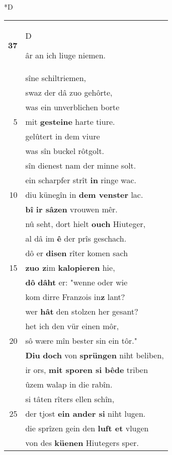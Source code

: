 \documentclass[8pt,a4paper,notitlepage]{article}
\begin{document}
\begin{table}[ht]
\begin{minipage}[t]{0.5\linewidth}
\small
\begin{center}*D
\end{center}
\begin{tabular}{rl}
\textbf{37} & \begin{large}D\end{large}âr an ich liuge niemen.\\ 
 & sîne schiltriemen,\\ 
 & swaz der dâ zuo gehôrte,\\ 
 & was ein unverblichen borte\\ 
5 & mit \textbf{gesteine} harte tiure.\\ 
 & gelûtert in dem viure\\ 
 & was sîn buckel rôtgolt.\\ 
 & sîn dienest nam der minne solt.\\ 
 & ein scharpfer strît \textbf{in} ringe wac.\\ 
10 & diu künegîn in \textbf{dem venster} lac.\\ 
 & \textbf{bî ir sâzen} vrouwen mêr.\\ 
 & nû seht, dort hielt \textbf{ouch} Hiuteger,\\ 
 & al dâ im \textbf{ê} der prîs geschach.\\ 
 & dô er \textbf{disen} rîter komen sach\\ 
15 & \textbf{zuo z}im \textbf{kalopieren} hie,\\ 
 & \textbf{dô} \textbf{dâht} er: "wenne oder wie\\ 
 & kom dirre Franzois in\textbf{z} lant?\\ 
 & wer \textbf{hât} den stolzen her gesant?\\ 
 & het ich den vür einen môr,\\ 
20 & sô wære mîn bester sin ein tôr."\\ 
 & \textbf{Diu} \textbf{doch} von \textbf{sprüngen} niht beliben,\\ 
 & ir ors, \textbf{mit sporen si bêde} triben\\ 
 & ûzem walap in die rabîn.\\ 
 & si tâten rîters ellen schîn,\\ 
25 & der tjost \textbf{ein ander si} niht lugen.\\ 
 & die sprîzen gein den \textbf{luft et} vlugen\\ 
 & von des \textbf{küenen} Hiutegers sper.\\ 

\end{tabular}
\end{minipage}
\end{table}
\end{document}
